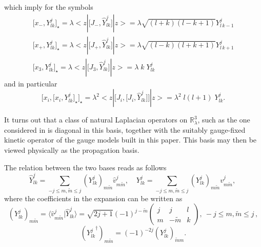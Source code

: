 \documentclass[a4paper,11pt]{article}
\numberwithin{equation}{section}
\newcommand\Rl{\mathbb{R}^3_\lambda}
\newcommand{\cg}[6]{
  \left(
  \begin{array}{cc|c}
  #1 & #3 & #5 \\
  #2 & #4 & #6
  \end{array}
  \right)
}
\theoremstyle{nonumberplain}
\begin{document}
which imply for the symbols
\begin{eqnarray}
{[}x_-,Y^j_{lk}{ ] }_\star=\lambda  <z|{[} J_{-},{\hat Y}^j_{lk} { ] }|z>= \lambda \sqrt{(l+k)(l-k+1)}Y^{j}_{l \, k-1} \nonumber\\
{[}x_+,Y^j_{lk}{ ] }_\star= \lambda  <z| {[} J_{+},{\hat Y}^j_{lk} { ] } |z>= \lambda \sqrt{(l-k)(l+k+1)}  Y^{j}_{l \, k+1}\nonumber\\
{[}x_3,Y^j_{lk}{ ] }_\star=\lambda  <z|{[}J_3,{\hat Y}^j_{lk} { ] } |z>=\lambda \; k \; Y^{j}_{l  k}\label{xharm}
\end{eqnarray}
and in particular
 \begin{equation}
{[}x_i,{[}x_i, Y^j_{lk}{ ]}_\star {]}_\star=\lambda ^2 <z|{[} J_{i},{[} J_{i},{\hat Y}^j_{lk} {]} {]} |z>=\lambda^2 \; l(l+1) \; Y^{j}_{l  k}. \label{xxharm}
\end{equation}

It turns out that a class of natural Laplacian operators on $\mathbb{R}^3_\lambda$, such as the one considered in \cite{vit-wal-12} is diagonal in this basis, together with the suitably gauge-fixed kinetic operator of the gauge models built in this paper. This basis may then be viewed physically as the propagation basis. \par 

The relation between the two  bases reads as follows 
\begin{equation}
 \hat Y^j_{lk}=\sum_{-j\le m,\tilde m\le j} ( Y^j_{lk})_{m \tilde m} \hat v^j_{m \tilde m},\   \;\;\; Y^j_{lk}=\sum_{-j\le m,\tilde m\le j} ( Y^j_{lk})_{m \tilde m} v^j_{m \tilde m},\ \label{matrixelemfuzzydef1}
\end{equation}
where the coefficients in the expansion can be written as
\begin{equation}
(Y^j_{lk})_{m \tilde m}=\langle \hat v^j_{m \tilde m}|\hat Y^j_{lk}\rangle={\sqrt{2j+1}}(-1)^{j-\tilde m}\cg {j}{m}{j}{-\tilde m}{l}{k},\ -j\le m,\tilde m\le j \, ,\label{matrixelemfuzzy}
\end{equation}
\begin{equation}
({Y^j_{lk}}^\dag)_{m \tilde m}=(-1)^{-2j} (Y^j_{lk})_{\tilde m m}. \label{fuzzydag}
\end{equation}


\end{document}
